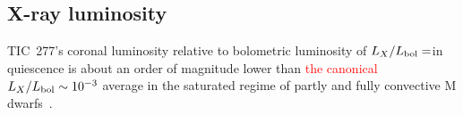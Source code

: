 \documentclass[twocolumn]{aastex631}
\begin{document}
\subsection{X-ray luminosity}
\label{sec:discussion:xraylum}


TIC~277's coronal luminosity relative to bolometric luminosity of $L_X/L_{\rm bol}=$\LXLbol in quiescence is about an order of magnitude lower than \textcolor{red}{the canonical} $L_X/L_{\rm bol}\sim 10^{-3}$ average in the saturated regime of partly and fully convective M dwarfs~\citep{wright2011stellaractivityrotation,wright2016solartype,wright2018stellar}.%
\end{document}
